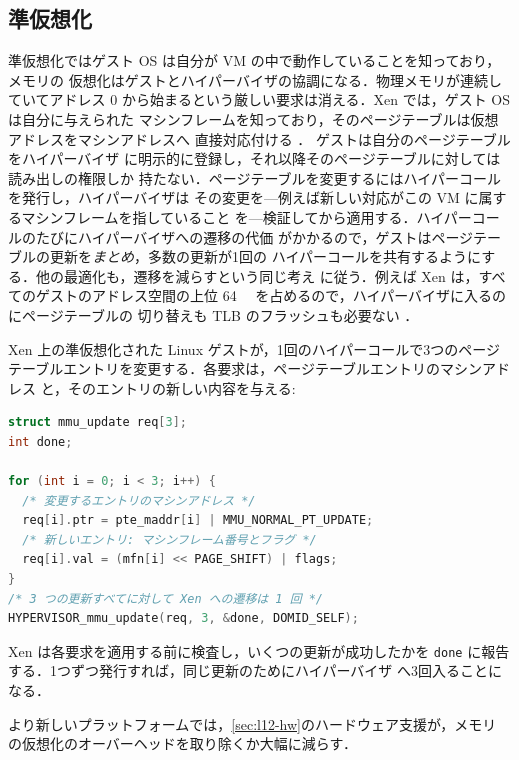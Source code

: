 \documentclass[../main.tex]{subfiles}
\begin{document}
\subsection{準仮想化}

準仮想化ではゲスト OS は自分が VM の中で動作していることを知っており，メモリの
仮想化はゲストとハイパーバイザの協調になる．物理メモリが連続していてアドレス 0
から始まるという厳しい要求は消える．Xen では，ゲスト OS は自分に与えられた
マシンフレームを知っており，そのページテーブルは仮想アドレスをマシンアドレスへ
直接対応付ける \cite{barham2003}．%
ゲストは自分のページテーブルをハイパーバイザ
に明示的に登録し，それ以降そのページテーブルに対しては読み出しの権限しか
持たない．ページテーブルを変更するにはハイパーコールを発行し，ハイパーバイザは
その変更を---例えば新しい対応がこの VM に属するマシンフレームを指していること
を---検証してから適用する．ハイパーコールのたびにハイパーバイザへの遷移の代価
がかかるので，ゲストはページテーブルの更新を\emph{まとめ}，多数の更新が1回の
ハイパーコールを共有するようにする．他の最適化も，遷移を減らすという同じ考え
に従う．例えば Xen は，すべてのゲストのアドレス空間の上位
\SI{64}{\mega\byte} を占めるので，ハイパーバイザに入るのにページテーブルの
切り替えも TLB のフラッシュも必要ない \cite{barham2003}．

\begin{example}
  Xen 上の準仮想化された Linux ゲストが，1回のハイパーコールで3つのページ
  テーブルエントリを変更する．各要求は，ページテーブルエントリのマシンアドレス
  と，そのエントリの新しい内容を与える:
  \begin{lstlisting}[language=C, numbers=none]
struct mmu_update req[3];
int done;

for (int i = 0; i < 3; i++) {
  /* 変更するエントリのマシンアドレス */
  req[i].ptr = pte_maddr[i] | MMU_NORMAL_PT_UPDATE;
  /* 新しいエントリ: マシンフレーム番号とフラグ */
  req[i].val = (mfn[i] << PAGE_SHIFT) | flags;
}
/* 3 つの更新すべてに対して Xen への遷移は 1 回 */
HYPERVISOR_mmu_update(req, 3, &done, DOMID_SELF);
\end{lstlisting}
  Xen は各要求を適用する前に検査し，いくつの更新が成功したかを
  \texttt{done} に報告する．1つずつ発行すれば，同じ更新のためにハイパーバイザ
  へ3回入ることになる．
\end{example}

より新しいプラットフォームでは，\cref{sec:l12-hw}のハードウェア支援が，メモリ
の仮想化のオーバーヘッドを取り除くか大幅に減らす．
\end{document}
